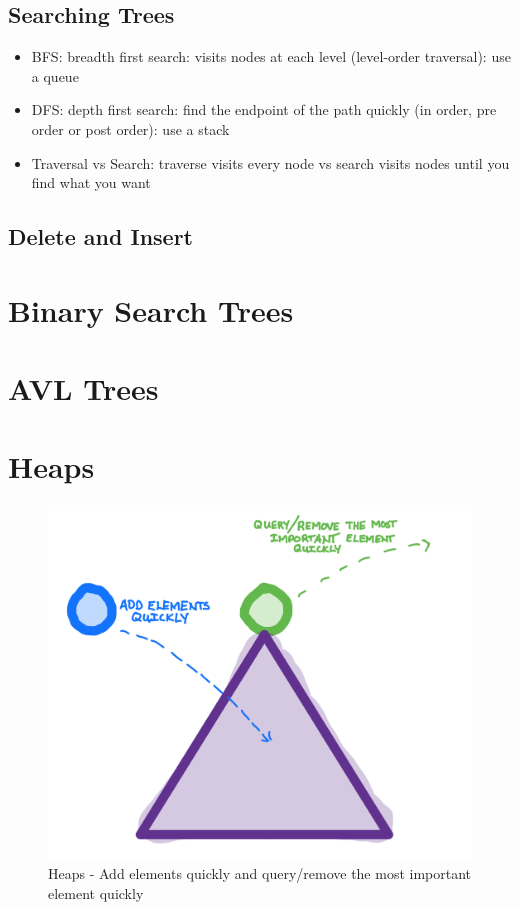 \documentclass[
]{book}
\begin{document}
\hypertarget{searching-trees}{%
\section{Searching Trees}\label{searching-trees}}

\begin{itemize}
\item
  BFS: breadth first search: visits nodes at each level (level-order traversal): use a queue
\item
  DFS: depth first search: find the endpoint of the path quickly (in order, pre order or post order): use a stack
\item
  Traversal vs Search: traverse visits every node vs search visits nodes until you find what you want
\end{itemize}

\hypertarget{delete-and-insert}{%
\section{Delete and Insert}\label{delete-and-insert}}

\hypertarget{binary-search-trees}{%
\chapter{Binary Search Trees}\label{binary-search-trees}}

\hypertarget{avl-trees}{%
\chapter{AVL Trees}\label{avl-trees}}

\hypertarget{heaps}{%
\chapter{Heaps}\label{heaps}}

\begin{figure}
\centering
\includegraphics{images/heaps/heap.png}
\caption{Heaps - Add elements quickly and query/remove the most important element quickly}
\end{figure}
\end{document}
